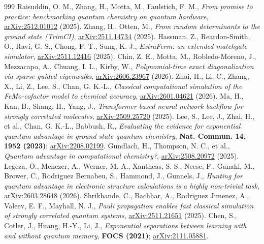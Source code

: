 \documentclass[11pt]{article}
\begin{document}
\begin{thebibliography}{999}
 Raisuddin, O. M., Zhang, H., Motta, M., Faulstich, F. M., \emph{From promise to practice: benchmarking quantum chemistry on quantum hardware}, \href{https://arxiv.org/abs/2512.01012}{arXiv:2512.01012} (2025).
 Zhang, H., Otten, M., \emph{From random determinants to the ground state (TrimCI)}, \href{https://arxiv.org/abs/2511.14734}{arXiv:2511.14734} (2025).
 Hassman, Z., Reardon-Smith, O., Ravi, G. S., Chong, F. T., Sung, K. J., \emph{ExtraFerm: an extended matchgate simulator}, \href{https://arxiv.org/abs/2511.12416}{arXiv:2511.12416} (2025).
 Chin, Z. E., Motta, M., Robledo-Moreno, J., Mezzacapo, A., Chuang, I. L., Kirby, W., \emph{Polynomial-time exact diagonalization via sparse guided eigenwalks}, \href{https://arxiv.org/abs/2606.23967}{arXiv:2606.23967} (2026).
 Zhai, H., Li, C., Zhang, X., Li, Z., Lee, S., Chan, G. K.-L., \emph{Classical computational simulation of the FeMo-cofactor model to chemical accuracy}, \href{https://arxiv.org/abs/2601.04621}{arXiv:2601.04621} (2026).
 Ma, H., Kan, B., Shang, H., Yang, J., \emph{Transformer-based neural-network backflow for strongly correlated molecules}, \href{https://arxiv.org/abs/2509.25720}{arXiv:2509.25720} (2025).
 Lee, S., Lee, J., Zhai, H., et al., Chan, G. K.-L., Babbush, R., \emph{Evaluating the evidence for exponential quantum advantage in ground-state quantum chemistry}, \textbf{Nat. Commun. 14, 1952 (2023)}; \href{https://arxiv.org/abs/2208.02199}{arXiv:2208.02199}.
 Gundlach, H., Thompson, N. C., et al., \emph{Quantum advantage in computational chemistry?}, \href{https://arxiv.org/abs/2508.20972}{arXiv:2508.20972} (2025).
 Legeza, Ö., Menczer, A., Werner, M. A., Xantheas, S. S., Neese, F., Ganahl, M., Brower, C., Rodriguez Bernabeu, S., Hammond, J., Gunnels, J., \emph{Hunting for quantum advantage in electronic structure calculations is a highly non-trivial task}, \href{https://arxiv.org/abs/2603.28648}{arXiv:2603.28648} (2026).
 Shrikhande, C., Bachhar, A., Rodriguez Jimenez, A., Valeev, E. F., Mayhall, N. J., \emph{Pauli propagation enables fast classical simulation of strongly correlated quantum systems}, \href{https://arxiv.org/abs/2511.21651}{arXiv:2511.21651} (2025).
 Chen, S., Cotler, J., Huang, H.-Y., Li, J., \emph{Exponential separations between learning with and without quantum memory}, \textbf{FOCS (2021)}; \href{https://arxiv.org/abs/2111.05881}{arXiv:2111.05881}.

\end{thebibliography}
\end{document}
